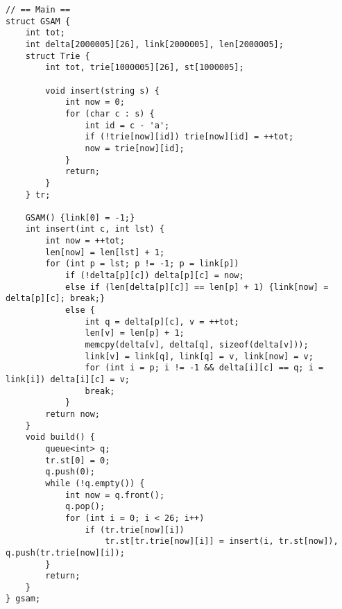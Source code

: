 \begin{verbatim}
// == Main ==
struct GSAM {
    int tot;
    int delta[2000005][26], link[2000005], len[2000005];
    struct Trie {
        int tot, trie[1000005][26], st[1000005];

        void insert(string s) {
            int now = 0;
            for (char c : s) {
                int id = c - 'a';
                if (!trie[now][id]) trie[now][id] = ++tot;
                now = trie[now][id];
            }
            return;
        }
    } tr;

    GSAM() {link[0] = -1;}
    int insert(int c, int lst) {
        int now = ++tot;
        len[now] = len[lst] + 1;
        for (int p = lst; p != -1; p = link[p])
            if (!delta[p][c]) delta[p][c] = now;
            else if (len[delta[p][c]] == len[p] + 1) {link[now] = delta[p][c]; break;}
            else {
                int q = delta[p][c], v = ++tot;
                len[v] = len[p] + 1;
                memcpy(delta[v], delta[q], sizeof(delta[v]));
                link[v] = link[q], link[q] = v, link[now] = v;
                for (int i = p; i != -1 && delta[i][c] == q; i = link[i]) delta[i][c] = v;
                break;
            }
        return now;
    }
    void build() {
        queue<int> q;
        tr.st[0] = 0;
        q.push(0);
        while (!q.empty()) {
            int now = q.front();
            q.pop();
            for (int i = 0; i < 26; i++)
                if (tr.trie[now][i])
                    tr.st[tr.trie[now][i]] = insert(i, tr.st[now]), q.push(tr.trie[now][i]);
        }
        return;
    }
} gsam;
\end{verbatim}